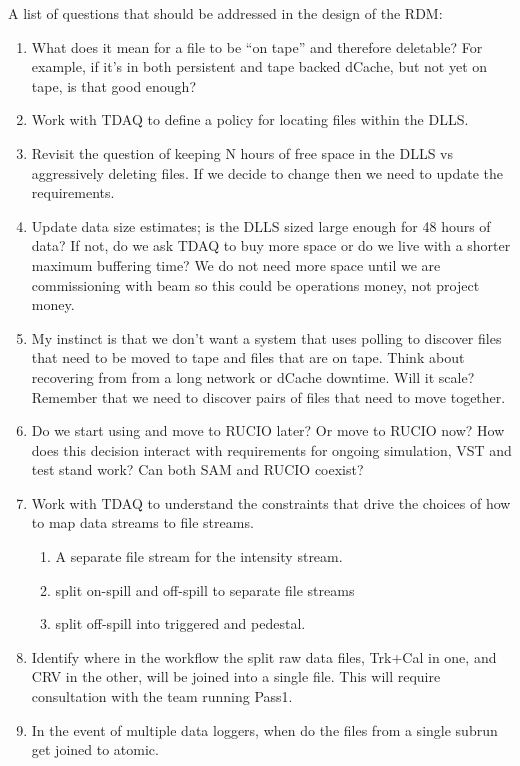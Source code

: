 A list of questions that should be addressed in the design of the RDM:

\begin{enumerate}
\item What does it mean for a file to be ``on tape'' and therefore deletable?
  For example, if it's in both persistent and tape backed dCache, but not yet on tape, is that good enough?
\item Work with TDAQ to define a policy for locating files within the DLLS.
\item Revisit the question of keeping N hours of free space in the DLLS vs aggressively deleting files.  If
  we decide to change then we need to update the requirements.
\item Update data size estimates;  is the DLLS sized large enough for 48 hours of data?
  If not, do we ask TDAQ to buy more space or do we live with a shorter maximum buffering time?
  We do not need more space until we are commissioning with beam so this could be operations money, not project money.
\item My instinct is that we don't want a system that uses polling to discover files that need to be moved to tape
  and files that are on tape.
  Think about recovering from from a long network or dCache downtime.  Will it scale?
  Remember that we need to discover pairs of files that need to move together.
\item Do we start using and move to RUCIO later?  Or move to RUCIO now?
  How does this decision interact with requirements for ongoing simulation, VST and test stand work?
  Can both SAM and RUCIO coexist?
\item Work with TDAQ to understand the constraints that drive the choices of how to
  map data streams to file streams.
  \begin{enumerate}
    \item A separate file stream for the intensity stream.
    \item split on-spill and off-spill to separate file streams
    \item split off-spill into triggered and pedestal.
  \end{enumerate}
\item Identify where in the workflow the split raw data files, Trk+Cal in one,
  and CRV in the other, will be joined into a single file.  This will require consultation with the team running
  Pass1.
\item In the event of multiple data loggers, when do the files from a single subrun get joined to atomic.

\end{enumerate}
